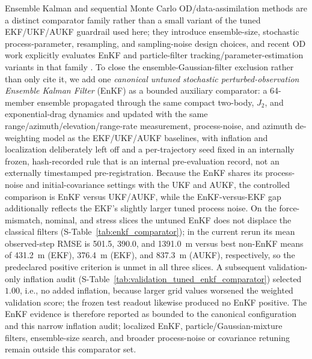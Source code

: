 \documentclass{article}
\begin{document}
Ensemble Kalman and sequential Monte Carlo OD/data-assimilation methods are a distinct comparator family rather than a small variant of the tuned EKF/UKF/AUKF guardrail used here; they introduce ensemble-size, stochastic process-parameter, resampling, and sampling-noise design choices, and recent OD work explicitly evaluates EnKF and particle-filter tracking/parameter-estimation variants in that family \cite{sztamfater2026sequential}. To close the ensemble-Gaussian-filter exclusion rather than only cite it, we add one \emph{canonical untuned stochastic perturbed-observation Ensemble Kalman Filter} (EnKF) \cite{evensen1994sequential,burgers1998analysis} as a bounded auxiliary comparator: a 64-member ensemble propagated through the same compact two-body, $J_2$, and exponential-drag dynamics and updated with the same range/azimuth/elevation/range-rate measurement, process-noise, and azimuth de-weighting model as the EKF/UKF/AUKF baselines, with inflation and localization deliberately left off and a per-trajectory seed fixed in an internally frozen, hash-recorded rule that is an internal pre-evaluation record, not an externally timestamped pre-registration. Because the EnKF shares its process-noise and initial-covariance settings with the UKF and AUKF, the controlled comparison is EnKF versus UKF/AUKF, while the EnKF-versus-EKF gap additionally reflects the EKF's slightly larger tuned process noise. On the force-mismatch, nominal, and stress slices the untuned EnKF does not displace the classical filters (S-Table~\ref{tab:enkf_comparator}); in the current rerun its mean observed-step RMSE is 501.5, 390.0, and 1391.0~m versus best non-EnKF means of 431.2~m (EKF), 376.4~m (EKF), and 837.3~m (AUKF), respectively, so the predeclared positive criterion is unmet in all three slices. A subsequent validation-only inflation audit (S-Table~\ref{tab:validation_tuned_enkf_comparator}) selected \(1.00\), i.e., no added inflation, because larger grid values worsened the weighted validation score; the frozen test readout likewise produced no EnKF positive. The EnKF evidence is therefore reported as bounded to the canonical configuration and this narrow inflation audit; localized EnKF, particle/Gaussian-mixture filters, ensemble-size search, and broader process-noise or covariance retuning remain outside this comparator set.
\end{document}
